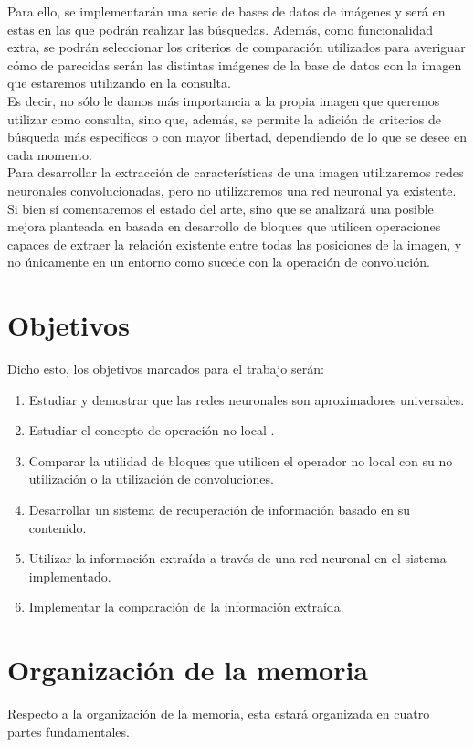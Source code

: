 Para ello, se implementarán una serie de bases de datos de imágenes y será en estas en las que podrán realizar las búsquedas. Además, como funcionalidad extra, se podrán seleccionar los criterios de comparación utilizados para averiguar cómo de parecidas serán las distintas imágenes de la base de datos con la imagen que estaremos utilizando en la consulta.\\

Es decir, no sólo le damos más importancia a la propia imagen que queremos utilizar como consulta, sino que, además, se permite la adición de criterios de búsqueda más específicos o con mayor libertad, dependiendo de lo que se desee en cada momento.\\

Para desarrollar la extracción de características de una imagen utilizaremos redes neuronales convolucionadas, pero no utilizaremos una red neuronal ya existente. Si bien sí comentaremos el estado del arte, sino que se analizará una posible mejora planteada en \cite{DBLP:journals/corr/abs-1711-07971} basada en desarrollo de bloques que utilicen operaciones capaces de extraer la relación existente entre todas las posiciones de la imagen, y no únicamente en un entorno como sucede con la operación de convolución.\\

\section*{Objetivos}
Dicho esto, los objetivos marcados para el trabajo serán:\\
\begin{enumerate}
\item Estudiar y demostrar que las redes neuronales son aproximadores universales.
\item Estudiar el concepto de operación no local \cite{DBLP:journals/corr/abs-1711-07971}.
\item Comparar la utilidad de bloques que utilicen el operador no local con su no utilización o la utilización de convoluciones.
\item Desarrollar un sistema de recuperación de información basado en su contenido.
\item Utilizar la información extraída a través de una red neuronal en el sistema implementado.
\item Implementar la comparación de la información extraída.
\end{enumerate}

\section*{Organización de la memoria}
Respecto a la organización de la memoria, esta estará organizada en cuatro partes fundamentales.\\


